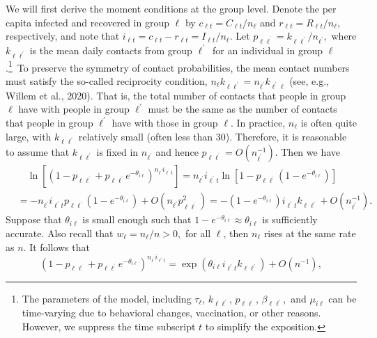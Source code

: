 \documentclass[12pt]{article}
\begin{document}
We will first derive the moment conditions at the group level. Denote the per
capita infected and recovered in group $\ell$ by $c_{\ell t}=C_{\ell
t}/n_{\ell}$ and $r_{\ell t}=R_{\ell t}/n_{\ell}$, respectively, and note that
$i_{\ell t}=c_{\ell t}-r_{\ell t}=I_{\ell t}/n_{\ell}$. Let $p_{\ell
\ell^{^{\prime}}}=k_{\ell\ell^{\prime}}/n_{\ell^{\prime}},$ where $k_{\ell
\ell^{\prime}}$ is the mean daily contacts from group $\ell^{\prime}$\ for an
individual in group $\ell$.\footnote{The parameters of the model, including
$\tau_{\ell}$, $k_{\ell\ell^{\prime}}$, $p_{\ell\ell^{^{\prime}}}$,
$\beta_{\ell\ell^{\prime}},$ and $\mu_{i\ell}$ can be time-varying due to
behavioral changes, vaccination, or other reasons. However, we suppress the
time subscript $t$ to simplify the exposition.}\ To preserve the symmetry of
contact probabilities, the mean contact numbers must satisfy the so-called
reciprocity condition, $n_{\ell}k_{\ell\ell^{\prime}}=n_{\ell^{\prime}}%
k_{\ell^{\prime}\ell}$ (see, e.g., Willem et al., 2020). That is, the total
number of contacts that people in group $\ell$ have with people in group
$\ell^{\prime}$ must be the same as the number of contacts that people in
group $\ell^{\prime}$ have with those in group $\ell$. In practice, $n_{\ell}$
is often quite large, with $k_{\ell\ell^{\prime}}$ relatively small (often
less than $30$). Therefore, it is reasonable to assume that $k_{\ell
\ell^{\prime}}$ is fixed in $n_{\ell^{\prime}}$ and hence $p_{\ell
\ell^{^{\prime}}}=O\left(  n_{\ell^{\prime}}^{-1}\right)  $. Then we have%
\begin{align}
&  \quad\ln\left[  \left(  1-p_{\ell\ell^{^{\prime}}}+p_{\ell\ell^{^{\prime}}%
}e^{-\theta_{i\ell}}\right)  ^{n_{\ell^{\prime}}i_{\ell^{\prime}t}}\right]
=n_{\ell^{\prime}}i_{\ell^{\prime}t}\ln\left[  1-p_{\ell\ell^{^{\prime}}%
}\left(  1-e^{-\theta_{i\ell}}\right)  \right]  \nonumber\\
&  =-n_{\ell^{\prime}}i_{\ell^{\prime}t}p_{\ell\ell^{^{\prime}}}\left(
1-e^{-\theta_{i\ell}}\right)  +O\left(  n_{\ell^{\prime}}p_{\ell\ell
^{^{\prime}}}^{2}\right)  =-\left(  1-e^{-\theta_{i\ell}}\right)
i_{\ell^{\prime}t}k_{\ell\ell^{\prime}}+O\left(  n_{\ell^{\prime}}%
^{-1}\right)  .\label{ln_approx}%
\end{align}
Suppose that $\theta_{i\ell}$ is small enough such that $1-e^{-\theta_{i\ell}%
}\approx\theta_{i\ell}$ is sufficiently accurate. Also recall that $w_{\ell
}=n_{\ell}/n>0,$ for all $\ell$, then $n_{\ell}$ rises at the same rate as
$n$. It follows that%
\begin{equation}
\left(  1-p_{\ell\ell^{^{\prime}}}+p_{\ell\ell^{^{\prime}}}e^{-\theta_{i\ell}%
}\right)  ^{n_{\ell^{^{\prime}}}i_{\ell^{\prime}t}}=\exp\left(  \theta_{i\ell
}i_{\ell^{\prime}t}k_{\ell\ell^{\prime}}\right)  +O\left(  n^{-1}\right)
,\label{pll'_approx}%
\end{equation}
\end{document}
